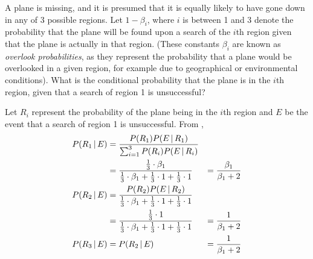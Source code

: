 \begin{changebar}
    \begin{example}
        A plane is missing, and it is presumed that it is equally likely to have gone down in any of 3 possible regions. Let $1 - \beta_i$, where $i$ is between 1 and 3 denote the probability that the plane will be found upon a search of the $i$th region given that the plane is actually in that region. (These constants $\beta_i$ are known as \emph{overlook probabilities}, as they represent the probability that a plane would be overlooked in a given region, for example due to geographical or environmental conditions). What is the conditional probability that the plane is in the $i$th region, given that a search of region 1 is unsuccessful?
    \end{example}
    \begin{solution}
        Let $R_i$ represent the probability of the plane being in the $i$th region and $E$ be the event that a search of region 1 is unsuccessful. From , \[
            \begin{aligned}
                P(R_1 \,\vert\, E) &= \frac{P(R_1)P(E \,\vert\, R_1)}{\sum^3_{i=1}P(R_i)P(E \,\vert\, R_i)} \\
                &= \frac{\frac{1}{3}\cdot \beta_1}{\frac{1}{3}\cdot \beta_1 + \frac{1}{3}\cdot 1 + \frac{1}{3} \cdot 1} &= \frac{\beta_1}{\beta_1 + 2} \\
                P(R_2 \,\vert\, E) &= \frac{P(R_2)P(E \,\vert\, R_2)}{\frac{1}{3}\cdot \beta_1 + \frac{1}{3}\cdot 1 + \frac{1}{3} \cdot 1} \\
                &= \frac{\frac{1}{3}\cdot 1}{\frac{1}{3}\cdot \beta_1 + \frac{1}{3}\cdot 1 + \frac{1}{3} \cdot 1} &= \frac{1}{\beta_1 + 2} \\
                P(R_3 \,\vert\, E) &= P(R_2 \,\vert\, E) &= \frac{1}{\beta_1 + 2}
            \end{aligned}
        \]
    \end{solution}
\end{changebar}
